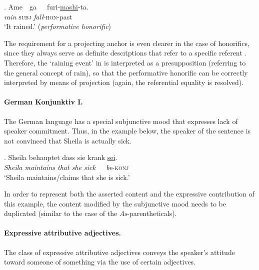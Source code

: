 \noindent\parbox[b]{\textwidth}{
\ex. Ame~~ga~~~furi-\underline{mashi}-ta.\\
\textit{rain} \textsc{subj} \textit{fall}-\textsc{hon}-past\\
`It rained.' (\textit{performative honorific})\\

}

\noindent The requirement for a projecting anchor is even clearer in the
case of honorifics, since they always serve as definite descriptions that
refer to a specific referent \citep[cf.][]{potts2004japanese}. Therefore,
the `raining event' in \Last is interpreted as a presupposition (referring
to the general concept of rain), so that the performative honorific can be
correctly interpreted by means of projection (again, the referential
equality is resolved).

\paragraph{German Konjunktiv I.} The German language has a special
subjunctive mood that expresses lack of speaker commitment. Thus, in the
example below, the speaker of the sentence is not convinced that Sheila is
actually sick.

\noindent\parbox[b]{\textwidth}{
\ex. Sheila behauptet dass sie krank \underline{sei}.\\
\textit{Sheila maintains that she sick~~~be}-\textsc{konj}\\
`Sheila maintains/claims that she is sick.'\\

}

\noindent In order to represent both the asserted content and the expressive
contribution of this example, the content modified by the subjunctive mood
needs to be duplicated (similar to the case of the
\textit{As}-parentheticals). 

\paragraph{Expressive attributive adjectives.} The class of expressive
attributive adjectives conveys the speaker's attitude toward someone of
something via the use of certain adjectives.

